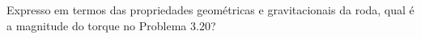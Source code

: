Expresso em termos das propriedades geométricas e gravitacionais da roda, qual é a magnitude do torque no Problema 3.20?

